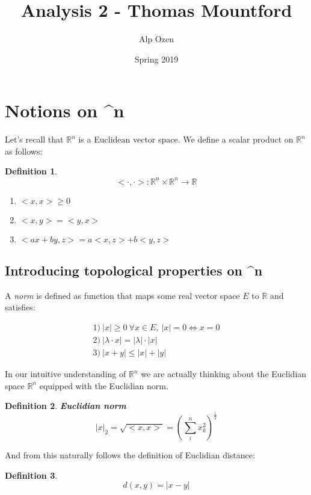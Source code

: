 \documentclass[titlepage]{article}
\title{\textbf{Analysis 2 - Thomas Mountford}}
\author{Alp Ozen}
\date{Spring 2019}
\newtheorem{definition}{Definition}
\newcommand{\Rn}{\mathbb{R}^n}
\begin{document}
\maketitle
\tableofcontents
\clearpage


\section{Notions on \Rn }

Let's recall that $\Rn$ is a Euclidean vector space. We define a scalar product on $\Rn$ as follows:

\begin{definition}
\begin{equation*}
    < \cdot, \cdot > : \Rn \times \Rn \to \mathbb{R}
\end{equation*}


\begin{enumerate}
    \item $<x,x> \geq 0$
    \item $<x,y> = <y,x>$
    \item $<ax + by, z> = a<x,z> + b<y,z>$
\end{enumerate}

\end{definition}

\subsection{Introducing topological properties on \Rn}
A \textit{norm} is defined as function that maps some real vector space $E$ to $\mathbb{R}$ and satisfies:

\begin{align*}
    1) \ |x| \geq 0 \ \forall x \in E, \ |x| = 0 \iff x = 0\\
    2) \ |\lambda \cdot x| = |\lambda| \cdot |x| \\
    3) \ |x+y| \leq |x| + |y|
\end{align*}

In our intuitive understanding of $\Rn$ we are actually thinking about the Euclidian space $\Rn$ equipped with the Euclidian norm.

\begin{definition}\textbf{Euclidian norm}
$$|x|_{2} = \sqrt{<x,x>} = (\sum^{n}_{i}x^{2}_{k} )^{\frac{1}{2}} $$
\end{definition}

And from this naturally follows the definition of Euclidian distance:
\begin{definition}
$$d(x,y) = |x-y|$$
\end{definition}
\end{document}
